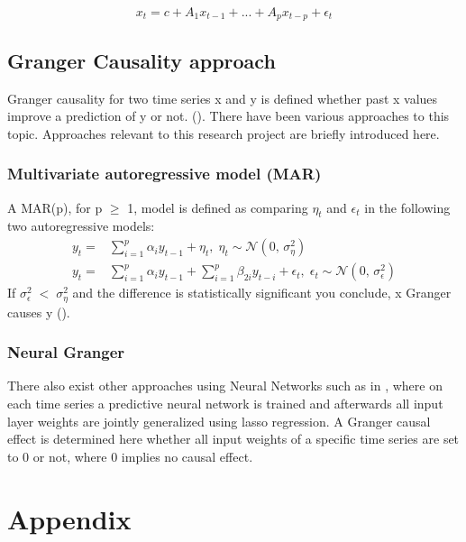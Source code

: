 \documentclass[a4paper]{report}
\begin{document}
	
	\begin{equation} \label {lasso}
		x_t = c+ A_1x_{t-1}+...+ A_p x_{t-p}+\epsilon_t
	\end{equation}

	
	
	\section{Granger Causality approach}
	Granger causality for two time series x and y is defined whether past x values improve a prediction of y or not. (\cite{Granger.1969}). 
	There have been various approaches to this topic. Approaches relevant to this research project are briefly introduced here.
	
	\subsection{Multivariate autoregressive model (MAR)} 
	A MAR(p), for p $\geq$ 1, model is defined as comparing $\eta_t$ and $\epsilon_t$ in the following two autoregressive models:
	\begin{align}
		y_t =& \sum_{i=1}^{p} \alpha_i y_{t-1}+\eta_t, \; \eta_t \sim \mathcal{N}(0,\,\sigma_\eta^{2})\\
		y_t = &\sum_{i=1}^{p} \alpha_i y_{t-1}+ \sum_{i=1}^{p}\beta_{2i}y_{t-i}+\epsilon_t, \; \epsilon_t \sim \mathcal{N}(0,\,\sigma_\epsilon^{2})
	\end{align}
	If $\sigma_\epsilon^{2} \; < \; \sigma_\eta^{2} $ and the difference is statistically significant you conclude, x Granger causes y (\cite{Geweke.1982}).\\
	
	\subsection{Neural Granger}
	There also exist other approaches using Neural Networks such as in \cite{Tank.2020}, where on each time series a predictive neural network is trained and afterwards all input layer weights are jointly generalized using lasso regression. A Granger causal effect is determined here whether all input weights of a specific time series are set to 0 or not, where 0 implies no causal effect. 
	
	
	
	\chapter{Appendix}
	
	\printbibliography
\end{document}
